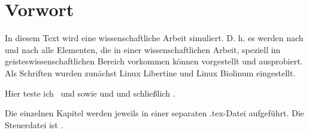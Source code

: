 \chapter*{Vorwort}
\label{cha:vorwort}
In diesem Text wird eine wissenschaftliche Arbeit simuliert. D. h. es werden nach und nach alle Elementen, die in einer wissenschaftlichen Arbeit, speziell im geisteswissenschaftlichen Bereich vorkommen können vorgestellt und ausprobiert. Als Schriften wurden zunächst Linux Libertine und Linux Biolinum eingestellt.

Hier teste ich \vChr\ und \adama sowie \jhwh und \adonaj und schließlich \elohim.

Die einzelnen Kapitel werden jeweils in einer separaten .tex-Datei aufgeführt. Die Steuerdatei ist . 